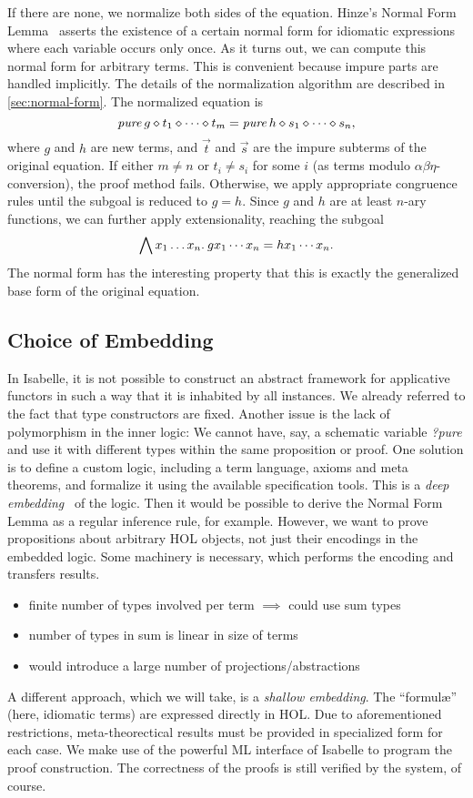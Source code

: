 If there are none, we normalize both sides of the equation.
Hinze's Normal Form Lemma~\cite[7]{hinze10} asserts the existence of a certain
normal form for idiomatic expressions where each variable occurs only once.
As it turns out, we can compute this normal form for arbitrary terms.
This is convenient because impure parts are handled implicitly.
The details of the normalization algorithm are described in \ref{sec:normal-form}.
The normalized equation is
\[ \operatorname{\mathit{pure}}{g} \diamond t_1 \diamond \cdots \diamond t_m = \operatorname{\mathit{pure}}{h} \diamond s_1 \diamond \cdots \diamond s_n, \]
where $g$ and $h$ are new terms, and $\vec t$ and $\vec s$ are the impure
subterms of the original equation.
If either $m \ne n$ or $t_i \ne s_i$ for some $i$ (as terms modulo
$\alpha\beta\eta$-conversion), the proof method fails.
Otherwise, we apply appropriate congruence rules until the subgoal is reduced
to $g = h$.
Since $g$ and $h$ are at least $n$-ary functions, we can further apply
extensionality, reaching the subgoal
\[ \bigwedge x_1 \dots x_n.\>g x_1 \cdots x_n = h x_1 \cdots x_n. \]
The normal form has the interesting property that this is exactly the
generalized base form of the original equation.

\todo

\subsection{Choice of Embedding}\label{subsec:embedding}

In Isabelle, it is not possible to construct an abstract framework for
applicative functors in such a way that it is inhabited by all instances.
We already referred to the fact that type constructors are fixed.
Another issue is the lack of polymorphism in the inner logic:
We cannot have, say, a schematic variable \textit{?pure} and use it with
different types within the same proposition or proof.
One solution is to define a custom logic, including a term language, axioms
and meta theorems, and formalize it using the available specification tools.
This is a \emph{deep embedding}~\cite{wildmoser04} of the logic.
Then it would be possible to derive the Normal Form Lemma as a regular
inference rule, for example.
However, we want to prove propositions about arbitrary HOL objects, not just
their encodings in the embedded logic.
Some machinery is necessary, which performs the encoding and transfers results.
\begin{itemize}
\item finite number of types involved per term $\implies$ could use sum types
\item number of types in sum is linear in size of terms
\item would introduce a large number of projections/abstractions
\end{itemize}
\todo

A different approach, which we will take, is a \emph{shallow embedding}.
The ``formul\ae'' (here, idiomatic terms) are expressed directly in HOL.
Due to aforementioned restrictions, meta-theorectical results must be provided
in specialized form for each case.
We make use of the powerful ML interface of Isabelle to program the proof
construction.
The correctness of the proofs is still verified by the system, of course.
